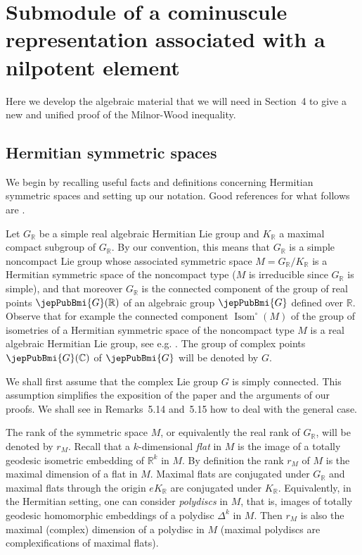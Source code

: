 \setcounter{section}{1}
\section{Submodule of a cominuscule representation associated with a nilpotent element}
Here we develop the algebraic material that we will need in Section~4 to give a new and unified proof of the Milnor-Wood inequality.

\subsection{Hermitian symmetric spaces}
We begin by recalling useful facts and definitions concerning Hermitian symmetric spaces and setting up our notation. Good references for what follows are \cite{jep93Wol72,jep93AMRT10,jep93Hel01,jep93Kna02}.

Let $G_{\mathbb R}$ be a simple real algebraic Hermitian Lie group and $K_{\mathbb R}$ a maximal compact subgroup of $G_{\mathbb R}$. By our convention, this means that $G_{\mathbb R}$ is a simple noncompact Lie group whose associated symmetric space $M=G_{\mathbb R}/K_{\mathbb R}$ is a Hermitian symmetric space of the noncompact type ($M$ is irreducible since $G_{\mathbb R}$ is simple), and that moreover $G_{\mathbb R}$ is the connected component of the group of real points $\jepPubBmi{G}(\mathbb R)$ of an algebraic group $\jepPubBmi{G}$ defined over $\mathbb R$. Observe that for example the connected component $\operatorname{Isom}^{\circ}(M)$ of the group of isometries of a Hermitian symmetric space of the noncompact type $M$ is a real algebraic Hermitian Lie group, see e.g. \cite[p.~106]{jep93AMRT10}. The group of complex points $\jepPubBmi{G}(\mathbb C)$ of $\jepPubBmi{G}$ will be denoted by $G$.

We shall first assume that the complex Lie group $G$ is simply connected. This assumption simplifies the exposition of the paper and the arguments of our proofs. We shall see in Remarks~5.14 and~5.15 how to deal with the general case.

The rank of the symmetric space $M$, or equivalently the real rank of $G_{\mathbb R}$, will be denoted by $r_M$. Recall that a $k$-dimensional \emph{flat} in $M$ is the image of a totally geodesic isometric embedding of $\mathbb R^k$ in $M$. By definition the rank $r_M$ of $M$ is the maximal dimension of a flat in $M$. Maximal flats are conjugated under $G_{\mathbb R}$ and maximal flats through the origin $eK_{\mathbb R}$ are conjugated under $K_{\mathbb R}$. Equivalently, in the Hermitian setting, one can consider \emph{polydiscs} in $M$, that is, images of totally geodesic homomorphic embeddings of a polydisc $\Delta^k$ in $M$. Then $r_M$ is also the maximal (complex) dimension of a polydisc in $M$ (maximal polydiscs are complexifications of maximal flats).

